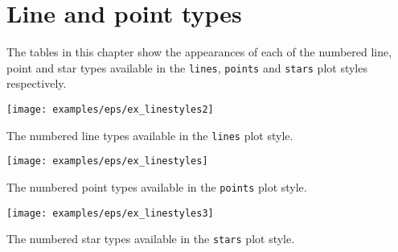 %
%
%
%
%



\chapter{Line and point types}
\label{ch:linetypes_table}

The tables in this chapter show the appearances of each of the numbered line,
point and star types available in the {\tt lines}, {\tt points} and {\tt stars}
plot styles respectively.

\begin{table}
\begin{center}
\texttt{[image: examples/eps/ex\_linestyles2]}
\end{center}
\caption{The numbered line types available in the {\tt lines} plot style.}
\end{table}

\begin{table}
\begin{center}
\texttt{[image: examples/eps/ex\_linestyles]}
\end{center}
\caption{The numbered point types available in the {\tt points} plot style.}
\end{table}

\begin{table}
\begin{center}
\texttt{[image: examples/eps/ex\_linestyles3]}
\end{center}
\caption{The numbered star types available in the {\tt stars} plot style.}
\end{table}

